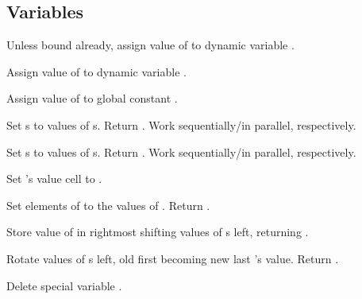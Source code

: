 \subsection{Variables}

\begin{LIST}{1cm}

  {
  Unless bound already, assign value of  to dynamic variable
  . 
  }

  {
  Assign value of  to dynamic variable .
  }

  {
  Assign value of  to global constant .
  }

  {
  Set s to values of s. Return . Work sequentially/in parallel, respectively. 
  }

  {
  Set s to values of s. Return . Work sequentially/in parallel, respectively. 
  }

  {
  Set 's value cell to .
  }

  {
  Set elements of  to the values of
  . Return .
  }

  {
  Store value of  in rightmost  shifting values of
  s left, returning . 
  }

  {
  Rotate values of s left, old first becoming new last
  's value. Return \retval{\NIL}.
  }

  {
  Delete special variable .
  }


\end{LIST}
